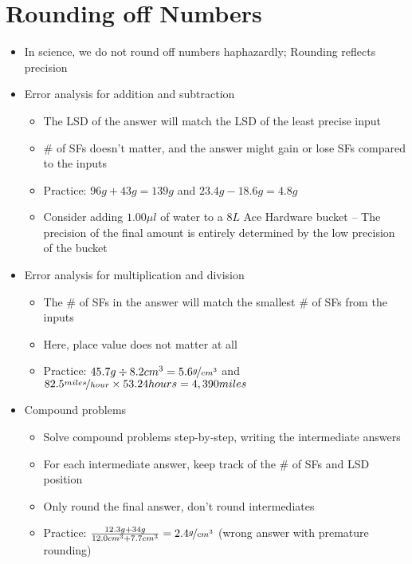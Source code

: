 \documentclass[12pt, openany, letterpaper]{memoir}
\begin{document}
\section{Rounding off Numbers}
\begin{itemize}
  \item In science, we do not round off numbers haphazardly; Rounding reflects precision
	\item Error analysis for addition and subtraction
	\begin{itemize}
		\item The LSD of the answer will match the LSD of the least precise input
		\item \# of SFs doesn't matter, and the answer might gain or lose SFs compared to the inputs 
		\item Practice: $96g+43g=139g$ \hspace{1em}and\hspace{1em} $23.4g-18.6g=4.8g$
		\item Consider adding $1.00\mu l$ of water to a $8L$ Ace Hardware bucket -- The precision of the final amount is entirely determined by the low precision of the bucket 
	\end{itemize}
	\item Error analysis for multiplication and division
	\begin{itemize}
		\item The \# of SFs in the answer will match the smallest \# of SFs from the inputs
		\item Here, place value does not matter at all
		\item Practice: $45.7g \div 8.2cm^3 = 5.6\nicefrac{g}{cm^3}$ \hspace{1em}and\hspace{1em} $82.5\nicefrac{miles}{hour}\times53.24hours=4,390miles$
	\end{itemize}
	\item Compound problems
	\begin{itemize}
		\item Solve compound problems step-by-step, writing the intermediate answers
		\item For each intermediate answer, keep track of the \# of SFs and LSD position
		\item Only round the final answer, don't round intermediates
		\item Practice: $\frac{12.3g+34g}{12.0cm^3+7.7cm^3}=2.4\nicefrac{g}{cm^3}$ (wrong answer with premature rounding)
	\end{itemize}
\end{itemize}
\end{document}
